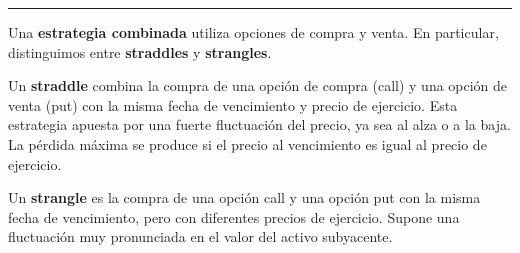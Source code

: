 \begin{f}

\end{f}
\hrule

\begin{f}
	
	Una \textbf{estrategia combinada} utiliza opciones de compra y venta. En particular, distinguimos entre \textbf{straddles} y \textbf{strangles}.
	
	Un \textbf{straddle} combina la compra de una opción de compra (call) y una opción de venta (put) con la misma fecha de vencimiento y precio de ejercicio. Esta estrategia apuesta por una fuerte fluctuación del precio, ya sea al alza o a la baja. La pérdida máxima se produce si el precio al vencimiento es igual al precio de ejercicio.
	
	Un \textbf{strangle} es la compra de una opción call y una opción put con la misma fecha de vencimiento, pero con diferentes precios de ejercicio. Supone una fluctuación muy pronunciada en el valor del activo subyacente.
	

\end{f}
